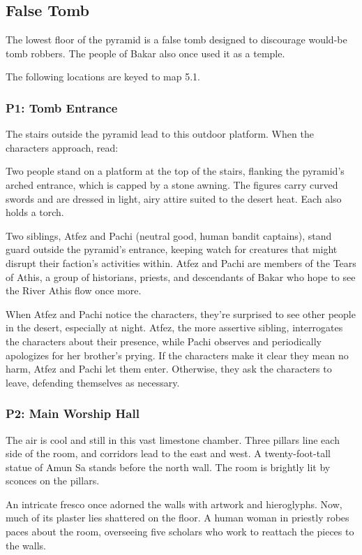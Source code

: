 \documentclass[10pt,a4paper,twoside,bg=print,twocolumn,openany,nodeprecatedcode]{dndbook}
\begin{document}
\subsection{False Tomb}
The lowest floor of the pyramid is a false tomb designed to discourage would-be tomb robbers. The people of Bakar also once used it as a temple.

The following locations are keyed to map 5.1.

\subsubsection{P1: Tomb Entrance}
The stairs outside the pyramid lead to this outdoor platform. When the characters approach, read:

\begin{DndReadAloud}{}
Two people stand on a platform at the top of the stairs, flanking the pyramid's arched entrance, which is capped by a stone awning. The figures carry curved swords and are dressed in light, airy attire suited to the desert heat. Each also holds a torch.

\end{DndReadAloud}

Two siblings, Atfez and Pachi (neutral good, human bandit captains), stand guard outside the pyramid's entrance, keeping watch for creatures that might disrupt their faction's activities within. Atfez and Pachi are members of the Tears of Athis, a group of historians, priests, and descendants of Bakar who hope to see the River Athis flow once more.

When Atfez and Pachi notice the characters, they're surprised to see other people in the desert, especially at night. Atfez, the more assertive sibling, interrogates the characters about their presence, while Pachi observes and periodically apologizes for her brother's prying. If the characters make it clear they mean no harm, Atfez and Pachi let them enter. Otherwise, they ask the characters to leave, defending themselves as necessary.

\subsubsection{P2: Main Worship Hall}
\begin{DndReadAloud}{}
The air is cool and still in this vast limestone chamber. Three pillars line each side of the room, and corridors lead to the east and west. A twenty-foot-tall statue of Amun Sa stands before the north wall. The room is brightly lit by sconces on the pillars.

An intricate fresco once adorned the walls with artwork and hieroglyphs. Now, much of its plaster lies shattered on the floor. A human woman in priestly robes paces about the room, overseeing five scholars who work to reattach the pieces to the walls.

\end{DndReadAloud}
\end{document}
